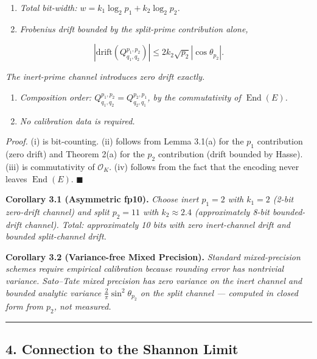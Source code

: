 \documentclass[
  11pt,
]{article}
\begin{document}
\begin{enumerate}
\def\labelenumi{(\roman{enumi})}
\item
  \emph{Total bit-width: \(w = k_1 \log_2 p_1 + k_2 \log_2 p_2\).}
\item
  \emph{Frobenius drift bounded by the split-prime contribution alone,}
\end{enumerate}

\[|\mathrm{drift}(Q_{q_1, q_2}^{p_1, p_2})| \leq 2 k_2 \sqrt{p_2}|\cos\theta_{p_2}|.\]

\emph{The inert-prime channel introduces zero drift exactly.}

\begin{enumerate}
\def\labelenumi{(\roman{enumi})}
\setcounter{enumi}{2}
\item
  \emph{Composition order:
  \(Q_{q_1, q_2}^{p_1, p_2} = Q_{q_2, q_1}^{p_2, p_1}\), by the
  commutativity of \(\operatorname{End}(E)\).}
\item
  \emph{No calibration data is required.}
\end{enumerate}

\emph{Proof.} (i) is bit-counting. (ii) follows from Lemma 3.1(a) for
the \(p_1\) contribution (zero drift) and Theorem 2(a) for the \(p_2\)
contribution (drift bounded by Hasse). (iii) is commutativity of
\(\mathcal{O}_K\). (iv) follows from the fact that the encoding never
leaves \(\operatorname{End}(E)\). \(\blacksquare\)

\textbf{Corollary 3.1 (Asymmetric fp10).} \emph{Choose inert \(p_1 = 2\)
with \(k_1 = 2\) (2-bit zero-drift channel) and split \(p_2 = 11\) with
\(k_2 \approx 2.4\) (approximately 8-bit bounded-drift channel). Total:
approximately 10 bits with zero inert-channel drift and bounded
split-channel drift.}

\textbf{Corollary 3.2 (Variance-free Mixed Precision).} \emph{Standard
mixed-precision schemes require empirical calibration because rounding
error has nontrivial variance. Sato--Tate mixed precision has zero
variance on the inert channel and bounded analytic variance
\(\frac{2}{\pi}\sin^2\theta_{p_2}\) on the split channel --- computed in
closed form from \(p_2\), not measured.}

\begin{center}\rule{0.5\linewidth}{0.5pt}\end{center}

\hypertarget{connection-to-the-shannon-limit}{%
\subsection{4. Connection to the Shannon
Limit}\label{connection-to-the-shannon-limit}}
\end{document}
